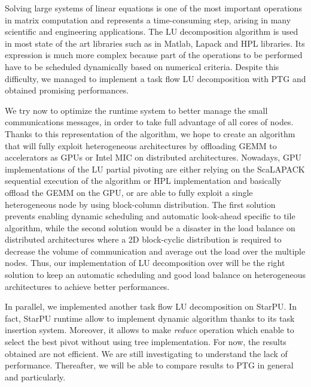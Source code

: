Solving large systems of linear equations is one of the most important operations in matrix computation and represents a time-consuming step, arising in many scientific and engineering applications. The LU decomposition algorithm is used in most state of the art libraries such as in Matlab, Lapack and HPL libraries. Its expression is much more complex because part of the operations to be performed have to be scheduled dynamically based on numerical criteria. Despite this difficulty, we managed to implement a task flow LU decomposition with PTG and obtained promising performances.

We try now to optimize the \dague runtime system to better manage the small communications messages, in order to take full advantage of all cores of nodes. 
Thanks to this representation of the algorithm, we hope to create an algorithm that will fully exploit heterogeneous architectures by offloading GEMM to accelerators as GPUs or Intel MIC on distributed architectures. Nowadays, GPU implementations of the LU partial pivoting are either relying on the ScaLAPACK sequential execution of the algorithm or HPL implementation and basically offload the GEMM on the GPU, or are able to fully exploit a single heterogeneous node by using block-column distribution. The first solution prevents enabling dynamic scheduling and automatic look-ahead specific to tile algorithm, while the second solution would be a disaster in the load balance on distributed architectures where a 2D block-cyclic distribution is required to decrease the volume of communication and average out the load over the multiple nodes. Thus, our implementation of LU decomposition over \dague will be the right solution to keep an automatic scheduling and good load balance on heterogeneous architectures to achieve better performances.

In parallel, we implemented another task flow LU decomposition on StarPU. In fact, StarPU runtime allow to implement dynamic algorithm  thanks to its task insertion system. Moreover, it allows to make \emph{reduce} operation which enable to select the best pivot without using tree implementation. For now, the results obtained are not efficient. We are still investigating to understand the lack of performance. Thereafter, we will be able to compare results to PTG in general and \dague particularly.